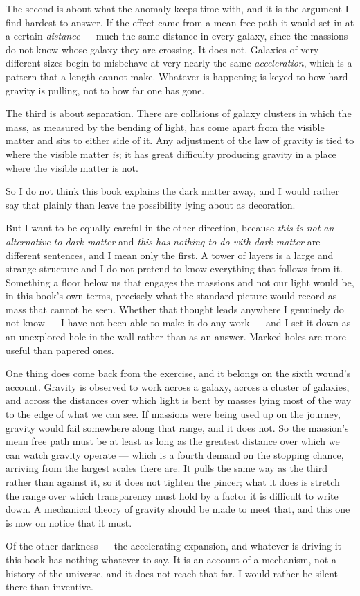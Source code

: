 The second is about what the anomaly keeps time with, and it is the argument I find hardest to answer. If the effect came from a mean free path it would set in at a certain \emph{distance} --- much the same distance in every galaxy, since the massions do not know whose galaxy they are crossing. It does not. Galaxies of very different sizes begin to misbehave at very nearly the same \emph{acceleration}, which is a pattern that a length cannot make. Whatever is happening is keyed to how hard gravity is pulling, not to how far one has gone.

The third is about separation. There are collisions of galaxy clusters in which the mass, as measured by the bending of light, has come apart from the visible matter and sits to either side of it. Any adjustment of the law of gravity is tied to where the visible matter \emph{is}; it has great difficulty producing gravity in a place where the visible matter is not.

So I do not think this book explains the dark matter away, and I would rather say that plainly than leave the possibility lying about as decoration.

But I want to be equally careful in the other direction, because \emph{this is not an alternative to dark matter} and \emph{this has nothing to do with dark matter} are different sentences, and I mean only the first. A tower of layers is a large and strange structure and I do not pretend to know everything that follows from it. Something a floor below us that engages the massions and not our light would be, in this book's own terms, precisely what the standard picture would record as mass that cannot be seen. Whether that thought leads anywhere I genuinely do not know --- I have not been able to make it do any work --- and I set it down as an unexplored hole in the wall rather than as an answer. Marked holes are more useful than papered ones.

One thing does come back from the exercise, and it belongs on the sixth wound's account. Gravity is observed to work across a galaxy, across a cluster of galaxies, and across the distances over which light is bent by masses lying most of the way to the edge of what we can see. If massions were being used up on the journey, gravity would fail somewhere along that range, and it does not. So the massion's mean free path must be at least as long as the greatest distance over which we can watch gravity operate --- which is a fourth demand on the stopping chance, arriving from the largest scales there are. It pulls the same way as the third rather than against it, so it does not tighten the pincer; what it does is stretch the range over which transparency must hold by a factor it is difficult to write down. A mechanical theory of gravity should be made to meet that, and this one is now on notice that it must.

Of the other darkness --- the accelerating expansion, and whatever is driving it --- this book has nothing whatever to say. It is an account of a mechanism, not a history of the universe, and it does not reach that far. I would rather be silent there than inventive.

